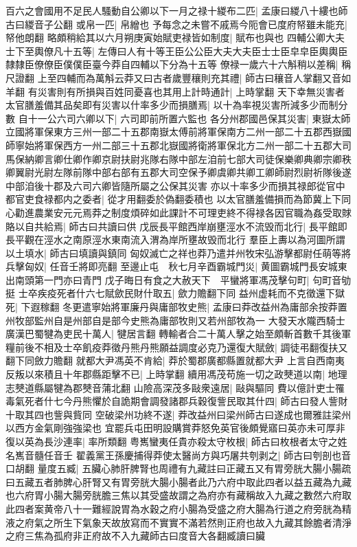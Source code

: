 百六之會國用不足民人騷動自公卿以下一月之禄十緵布二匹|{
	孟康曰緵八十縷也師古曰緵音子公翻}
或帛一匹|{
	帛繒也}
予每念之未嘗不戚焉今阨會已度府帑雖未能充|{
	帑他朗翻}
略頗稍給其以六月朔庚寅始賦吏禄皆如制度|{
	賦布也與也}
四輔公卿大夫士下至輿僚凡十五等|{
	左傳曰人有十等王臣公公臣大夫大夫臣士士臣皁皁臣輿輿臣隸隸臣僚僚臣僕僕臣臺今莽自四輔以下分為十五等}
僚禄一歲六十六斛稍以差稱|{
	稱尺證翻}
上至四輔而為萬斛云莽又曰古者歲豐穰則充其禮|{
	師古曰穰音人掌翻又音如羊翻}
有災害則有所損與百姓同憂喜也其用上計時通計|{
	上時掌翻}
天下幸無災害者太官膳羞備其品矣即有災害以什率多少而損膳焉|{
	以十為率視災害所減多少而制分數}
自十一公六司六卿以下|{
	六司即前所置六監也}
各分州郡國邑保其災害|{
	東嶽太師立國將軍保東方三州一部二十五郡南嶽太傅前將軍保南方二州一部二十五郡西嶽國師寧始將軍保西方一州二部三十五郡北嶽國將衛將軍保北方二州一部二十五郡大司馬保納卿言卿仕卿作卿京尉扶尉兆隊右隊中部左洎前七部大司徒保樂卿典卿宗卿秩卿翼尉光尉左隊前隊中部右部有五郡大司空保予卿虞卿共卿工卿師尉烈尉祈隊後遂中部洎後十郡及六司六卿皆隨所屬之公保其災害}
亦以十率多少而損其禄郎從官中都官吏食禄都内之委者|{
	從才用翻委於偽翻委積也}
以太官膳羞備損而為節冀上下同心勸進農業安元元焉莽之制度煩碎如此課計不可理吏終不得禄各因官職為姦受取賕賂以自共給焉|{
	師古曰共讀曰供}
戊辰長平館西岸崩壅涇水不流毁而北行|{
	長平館即長平觀在涇水之南原涇水東南流入渭為岸所壅故毁而北行}
羣臣上夀以為河圖所謂以土填水|{
	師古曰填讀與鎮同}
匈奴滅亡之祥也莽乃遣并州牧宋弘游擊都尉任萌等將兵擊匈奴|{
	任音壬將即亮翻}
至邊止屯　秋七月辛酉霸城門災|{
	黄圖霸城門長安城東出南頭第一門亦曰青門}
戊子晦日有食之大赦天下　平蠻將軍馮茂擊句町|{
	句町音劬挺}
士卒疾疫死者什六七賦歛民財什取五|{
	歛力贍翻下同}
益州虚耗而不克徵還下獄死|{
	下遐稼翻}
冬更遣寧始將軍廉丹與庸部牧史熊|{
	孟康曰莽改益州為庸部余按莽置州牧部監州自是州部自是部今史熊為庸部牧則又若州部牧為一}
大發天水隴西騎士廣漢巴蜀犍為吏民十萬人|{
	犍居言翻}
轉輸者合二十萬人擊之始至頗斬首數千其後軍糧前後不相及士卒飢疫莽徵丹熊丹熊願益調度必克乃還復大賦斂|{
	調徒弔翻復扶又翻下同斂力贍翻}
就都大尹馮英不肯給|{
	莽於蜀郡廣都縣置就都大尹}
上言自西南夷反叛以來積且十年郡縣距擊不已|{
	上時掌翻}
續用馮茂苟施一切之政僰道以南|{
	地理志僰道縣屬犍為郡僰音蒲北翻}
山險高深茂多敺衆遠居|{
	敺與驅同}
費以億計吏士罹毒氣死者什七今丹熊懼於自詭期會調發諸郡兵穀復訾民取其什四|{
	師古曰發人訾財十取其四也訾與貲同}
空破梁州功終不遂|{
	莽改益州曰梁州師古曰遂成也爾雅註梁州以西方金氣剛強強梁也}
宜罷兵屯田明設購賞莽怒免英官後頗覺寤曰英亦未可厚非復以英為長沙連率|{
	率所類翻}
粤嶲蠻夷任貴亦殺太守枚根|{
	師古曰枚根者太守之姓名嶲音髓任音壬}
翟義黨王孫慶捕得莽使太醫尚方與巧屠共刳剥之|{
	師古曰刳剖也音口胡翻}
量度五臧|{
	五臟心肺肝脾腎也周禮有九藏註曰正藏五又有胃旁胱大腸小腸疏曰五藏五者肺脾心肝腎又有胃旁胱大腸小腸者此乃六府中取此四者以益五藏為九藏也六府胃小腸大腸旁胱膽三焦以其受盛故謂之為府亦有藏稱故入九藏之數然六府取此四者案黄帝八十一難經說胃為水穀之府小腸為受盛之府大腸為行道之府旁胱為精液之府氣之所生下氣象天故放寫而不實實不滿若然則正府也故入九藏其餘膽者清淨之府三焦為孤府非正府故不入九藏師古曰度音大各翻臧讀曰臟}
